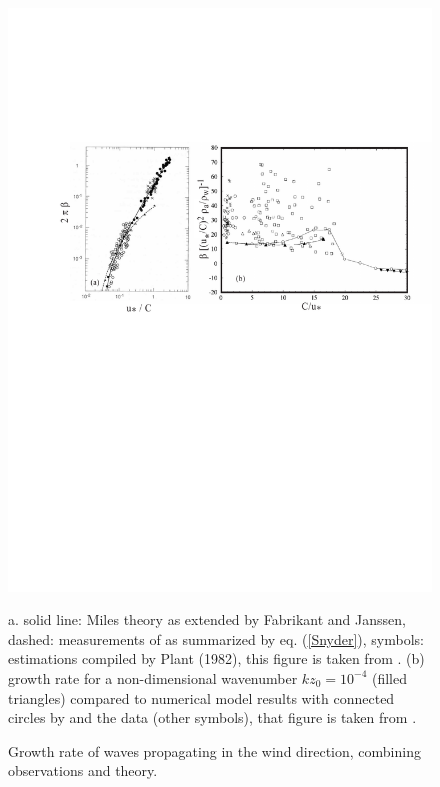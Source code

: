 \begin{figure}
\centerline{\includegraphics[width=\textwidth]{FIGS_CH_SOURCETERMS/Belcher_EJMB1999.pdf}}
\caption{Growth rate of waves propagating in the wind direction, combining observations and theory.}{a. solid line: Miles theory 
as extended by Fabrikant and Janssen, dashed:
measurements of \cite{Snyder&al.1981} as summarized by eq. (\ref{Snyder}), symbols: estimations compiled by Plant (1982), this figure 
is taken from \cite{Janssen&al.1994}. (b) growth rate for a non-dimensional wavenumber  $k z_0=10^{-4}$ (filled triangles) compared
to numerical model results with connected circles by \cite{Mastenbroek1996}  and the \cite{Plant1982} data (other symbols), that figure is 
taken from \cite{Belcher1999}.} \label{fig_Belcher}
\end{figure}





